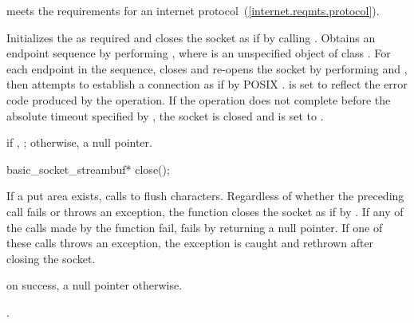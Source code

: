 \begin{itemdescr}
\pnum
\constraints
{} meets the requirements for an internet protocol~(\ref{internet.reqmts.protocol}).

\pnum
\effects Initializes the  as required and closes the socket as if by calling . Obtains an endpoint sequence  by performing , where  is an unspecified object of class . For each endpoint  in the sequence, closes and re-opens the socket by performing  and , then attempts to establish a connection as if by POSIX .  is set to reflect the error code produced by the operation. If the operation does not complete before the absolute timeout specified by , the socket is closed and  is set to .

\pnum
\returns if , ; otherwise, a null pointer.

\end{itemdescr}

\begin{itemdecl}
basic_socket_streambuf* close();
\end{itemdecl}

\begin{itemdescr}
\pnum
\effects If a put area exists, calls  to flush characters. Regardless of whether the preceding call fails or throws an exception, the function closes the socket as if by . If any of the calls made by the function fail,  fails by returning a null pointer. If one of these calls throws an exception, the exception is caught and rethrown after closing the socket.

\pnum
\returns {} on success, a null pointer otherwise.

\pnum
\postconditions {}.
\end{itemdescr}

